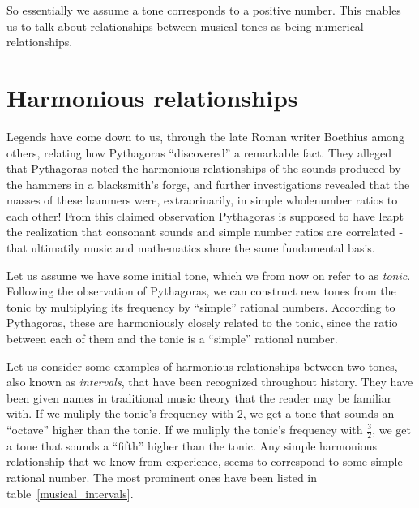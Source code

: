 \documentclass[a4paper]{book}
\theoremstyle{definition}
\begin{document}

So essentially we assume a tone corresponds to a positive number.
This enables us to talk about relationships between musical tones as being numerical relationships.

\section{Harmonious relationships}
Legends have come down to us, through the late Roman writer Boethius among others, relating how Pythagoras ``discovered'' a remarkable fact.
They alleged that Pythagoras noted the harmonious relationships of the sounds produced by the hammers in a blacksmith's forge, and further investigations revealed that the masses of these hammers were, extraorinarily, in simple wholenumber ratios to each other!
From this claimed observation Pythagoras is supposed to have leapt the realization that consonant sounds and simple number ratios are correlated - that ultimatily music and mathematics share the same fundamental basis. \cite{NeilBibby}

Let us assume we have some initial tone, which we from now on refer to as \emph{tonic}.
Following the observation of Pythagoras, we can construct new tones from the tonic by multiplying its frequency by ``simple'' rational numbers.
According to Pythagoras, these are harmoniously closely related to the tonic, since the ratio between each of them and the tonic is a ``simple'' rational number.

Let us consider some examples of harmonious relationships between two tones, also known as \emph{intervals}, that have been recognized throughout history.
They have been given names in traditional music theory that the reader may be familiar with.
If we muliply the tonic's frequency with $2$, we get a tone that sounds an ``octave'' higher than the tonic.
If we muliply the tonic's frequency with $\frac{3}{2}$, we get a tone that sounds a ``fifth'' higher than the tonic.
Any simple harmonious relationship that we know from experience, seems to correspond to some simple rational number.
The most prominent ones have been listed in table~\ref{musical_intervals}.
\end{document}
